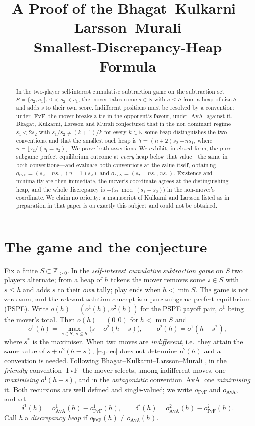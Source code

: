 \documentclass[11pt]{amsart}
\title[The smallest discrepancy heap]
{A Proof of the Bhagat--Kulkarni--Larsson--Murali\\
 Smallest-Discrepancy-Heap Formula}
\date{}
\theoremstyle{definition}
\theoremstyle{remark}
\DeclareMathOperator{\FvF}{FvF}
\DeclareMathOperator{\AvA}{AvA}
\begin{document}
\begin{abstract}
In the two-player self-interest cumulative subtraction game on the subtraction
set $S=\{s_2,s_1\}$, $0<s_2<s_1$, the mover takes some $s\in S$ with $s\le h$
from a heap of size $h$ and adds $s$ to their own score. Indifferent positions
must be resolved by a convention: under $\FvF$ the mover breaks a tie in the
opponent's favour, under $\AvA$ against it. Bhagat, Kulkarni, Larsson and
Murali conjectured that in the non-dominant regime $s_1<2s_2$ with
$s_1/s_2\neq(k+1)/k$ for every $k\in\mathbb N$ some heap distinguishes the two
conventions, and that the smallest such heap is
$h=(n+2)s_2+ns_1$, where $n=\lfloor s_2/(s_1-s_2)\rfloor$. We prove both
assertions. We exhibit, in closed form, the pure subgame perfect equilibrium
outcome at \emph{every} heap below that value---the same in both
conventions---and evaluate both conventions at the value itself, obtaining
$o_{\FvF}=(s_2+ns_1,\,(n+1)s_2)$ and $o_{\AvA}=(s_2+ns_1,\,ns_1)$. Existence
and minimality are then immediate, the mover's coordinate agrees at the
distinguishing heap, and the whole discrepancy is
$-\bigl(s_2\bmod(s_1-s_2)\bigr)$ in the non-mover's coordinate. We claim no
priority: a manuscript of Kulkarni and Larsson listed as in preparation in that
paper is on exactly this subject and could not be obtained.
\end{abstract}

\maketitle

\section{The game and the conjecture}

Fix a finite $S\subset\mathbb Z_{>0}$. In the \emph{self-interest cumulative
subtraction game} on $S$ two players alternate; from a heap of $h$ tokens the
mover removes some $s\in S$ with $s\le h$ and adds $s$ to their \emph{own}
tally; play ends when $h<\min S$. The game is not zero-sum, and the relevant
solution concept is a pure subgame perfect equilibrium (PSPE). Write
$o(h)=(o^1(h),o^2(h))$ for the PSPE payoff pair, $o^1$ being the mover's total.
Then $o(h)=(0,0)$ for $h<\min S$ and
\begin{equation}\label{eq:rec}
  o^1(h)=\max_{s\in S,\ s\le h}\bigl(s+o^2(h-s)\bigr),
  \qquad
  o^2(h)=o^1(h-s^*),
\end{equation}
where $s^*$ is the maximiser. When two moves are \emph{indifferent}, i.e.\ they
attain the same value of $s+o^2(h-s)$, \eqref{eq:rec} does not determine
$o^2(h)$ and a convention is needed. Following
Bhagat--Kulkarni--Larsson--Murali \cite{BKLM}, in the \emph{friendly}
convention $\FvF$ the mover selects, among indifferent moves, one
\emph{maximising} $o^1(h-s)$, and in the \emph{antagonistic} convention $\AvA$
one \emph{minimising} it. Both recursions are well defined and single-valued;
we write $o_{\FvF}$ and $o_{\AvA}$, and set
\[
  \delta^1(h)=o^1_{\AvA}(h)-o^1_{\FvF}(h),
  \qquad
  \delta^2(h)=o^2_{\AvA}(h)-o^2_{\FvF}(h).
\]
Call $h$ a \emph{discrepancy heap} if $o_{\FvF}(h)\neq o_{\AvA}(h)$.
\end{document}
